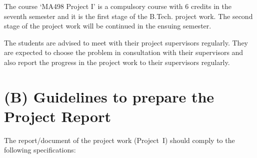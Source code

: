 \documentclass[12pt, a4paper]{article}
\begin{document}
The course `MA498 Project I' is a compulsory course with $6$ credits in the seventh
semester and it is the first stage of the B.Tech. project work.
The second stage of the project work will be continued in the ensuing semester.

The students are advised to meet with their project supervisors regularly.
They are expected to choose the problem in consultation with their
supervisors and also report the progress in the project work to their supervisors regularly.




\section*{(B) Guidelines to prepare the Project Report}

The report/document of the project work (Project~I) should comply to the following specifications:
\end{document}
